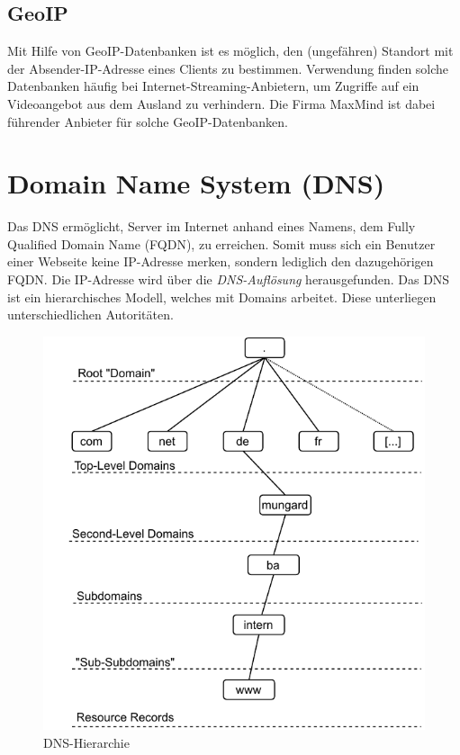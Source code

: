 \subsection{GeoIP}
Mit Hilfe von GeoIP-Datenbanken ist es möglich, den (ungefähren) Standort mit der Absender-IP-Adresse eines Clients zu bestimmen. Verwendung finden solche Datenbanken häufig bei Internet-Streaming-Anbietern, um Zugriffe auf ein Videoangebot aus dem Ausland zu verhindern. Die Firma MaxMind ist dabei führender Anbieter für solche GeoIP-Datenbanken.

\section{Domain Name System (DNS)}\label{DNS}
Das DNS ermöglicht, Server im Internet anhand eines Namens, dem Fully Qualified Domain Name (FQDN), zu erreichen. Somit muss sich ein Benutzer einer Webseite keine IP-Adresse merken, sondern lediglich den dazugehörigen FQDN. Die IP-Adresse wird über die \textit{DNS-Auflösung} herausgefunden. Das DNS ist ein hierarchisches Modell, welches mit Domains arbeitet. Diese unterliegen unterschiedlichen Autoritäten. 
\begin{figure}[h]
  \centering
  \includegraphics{Figures/dns_autoritative.pdf}
  \caption{DNS-Hierarchie}
  \label{grafik: napt}
\end{figure}\FloatBarrier

